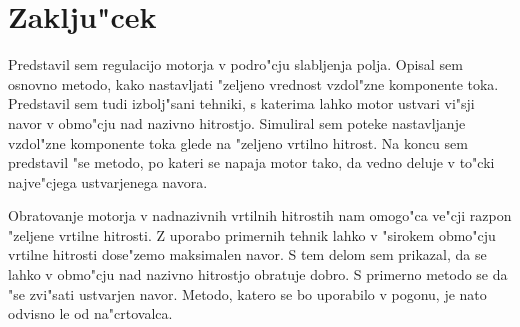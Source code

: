 \documentclass[journal,a4paper,twoside]{sty/IEEEtran}
\begin{document}
\section{Zaklju"cek}

Predstavil sem regulacijo motorja v podro"cju slabljenja polja. Opisal sem osnovno metodo, kako nastavljati "zeljeno vrednost vzdol"zne komponente toka. Predstavil sem tudi izbolj"sani tehniki, s katerima lahko motor ustvari vi"sji navor v obmo"cju nad nazivno hitrostjo. Simuliral sem poteke nastavljanje vzdol"zne komponente toka glede na "zeljeno vrtilno hitrost. Na koncu sem predstavil "se metodo, po kateri se napaja motor tako, da vedno deluje v to"cki najve"cjega ustvarjenega navora.

Obratovanje motorja v nadnazivnih vrtilnih hitrostih nam omogo"ca ve"cji razpon "zeljene vrtilne hitrosti. Z uporabo primernih tehnik lahko v "sirokem obmo"cju vrtilne hitrosti dose"zemo maksimalen navor. S tem delom sem prikazal, da se lahko v obmo"cju nad nazivno hitrostjo obratuje dobro. S primerno metodo se da "se zvi"sati ustvarjen navor. Metodo, katero se bo uporabilo v pogonu, je nato odvisno le od na"crtovalca.



%
%
%
%
%
%
\end{document}
